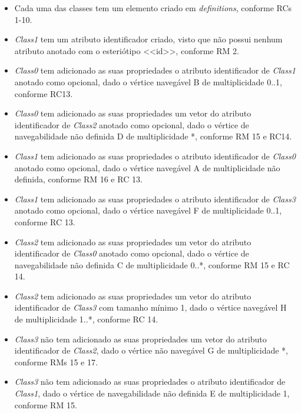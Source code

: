 \begin{itemize}
    \item Cada uma das classes tem um elemento criado em \textit{definitions}, conforme RCs 1-10.

    \item \textit{Class1} tem um atributo identificador criado, visto que não possui nenhum atributo anotado com o esteriótipo <<id>>, conforme RM 2.

    \item \textit{Class0} tem adicionado as suas propriedades o atributo identificador de \textit{Class1} anotado como opcional, dado o vértice navegável B de multiplicidade 0..1, conforme RC13.

    \item \textit{Class0} tem adicionado as suas propriedades um vetor do atributo identificador de \textit{Class2} anotado como opcional, dado o vértice de navegabilidade não definida D de multiplicidade *, conforme RM 15 e RC14.

    \item \textit{Class1} tem adicionado as suas propriedades o atributo identificador de \textit{Class0} anotado como opcional, dado o vértice navegável A de multiplicidade não definida, conforme RM 16 e RC 13.

    \item \textit{Class1} tem adicionado as suas propriedades o atributo identificador de \textit{Class3} anotado como opcional, dado o vértice navegável F de multiplicidade 0..1, conforme RC 13.

    \item \textit{Class2} tem adicionado as suas propriedades um vetor do atributo identificador de \textit{Class0} anotado como opcional, dado o vértice de navegabilidade não definida C de multiplicidade 0..*, conforme RM 15 e RC 14.

    \item \textit{Class2} tem adicionado as suas propriedades um vetor do atributo identificador de \textit{Class3} com tamanho mínimo 1, dado o vértice navegável H de multiplicidade 1..*, conforme RC 14.

    \item \textit{Class3} não tem adicionado as suas propriedades um vetor do atributo identificador de \textit{Class2}, dado o vértice não navegável G de multiplicidade *, conforme RMs 15 e 17.

    \item \textit{Class3} não tem adicionado as suas propriedades o atributo identificador de \textit{Class1}, dado o vértice de navegabilidade não definida E de multiplicidade 1, conforme RM 15.
\end{itemize}

